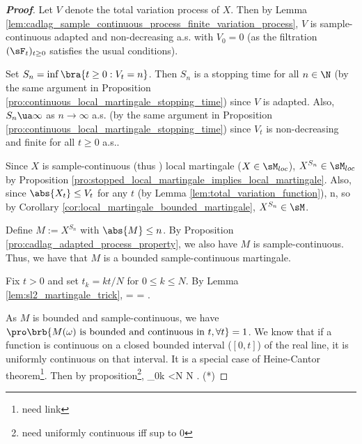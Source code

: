 \begin{proof}[\bf Proof]
Let $V$ denote the total variation process of $X$. Then by Lemma \ref{lem:cadlag_sample_continuous_process_finite_variation_process}, $V$ is sample-continuous adapted and non-decreasing a.s. with $V_0 = 0$ (as the filtration $(\sF_t)_{t\geq 0}$ satisfies the usual conditions).

Set $S_n = \inf\bra{t \geq 0 : V_t = n}$. Then $S_n$ is a stopping time for all $n \in \N$ (by the same argument in Proposition \ref{pro:continuous_local_martingale_stopping_time}) since $V$ is adapted. Also, $S_n \ua \infty$ as $n \to \infty$ a.s. (by the same argument in Proposition \ref{pro:continuous_local_martingale_stopping_time}) since $V_t$ is non-decreasing and finite for all $t \geq 0$ a.s..

Since $X$ is sample-continuous (thus \cadlag) local martingale ($X\in \sM_{loc}$), $X^{S_n} \in \sM_{loc}$ by Proposition \ref{pro:stopped_local_martingale_implies_local_martingale}. Also, since $\abs{X_t} \leq V_t$ for any $t$ (by Lemma \ref{lem:total_variation_function}),
\be
{} \leq {} \leq n,
\ee
so by Corollary \ref{cor:local_martingale_bounded_martingale}, $X^{S_n} \in \sM$.

Define $M := X^{S_n}$ with $\abs{M}\leq n$. By Proposition \ref{pro:cadlag_adapted_process_property}, we also have $M$ is sample-continuous. Thus, we have that $M$ is a bounded sample-continuous martingale.


Fix $t > 0$ and set $t_k = kt/N$ for $0 \leq k \leq N$. By Lemma \ref{lem:sl2_martingale_trick},
\be
\E{} = \E{} = \E{} \leq  \E{}.\nonumber
\ee

As $M$ is bounded and sample-continuous, we have $\pro\brb{M(\omega) \text{ is bounded and continuous in }t, \forall t} = 1$. We know that if a function is continuous on a closed bounded interval ($[0,t]$) of the real line, it is uniformly continuous on that interval. It is a special case of Heine-Cantor theorem\footnote{need link}. Then by proposition\footnote{need uniformly continuous iff sup to 0},
\be
\sup_{0\leq k <N}   \quad {}N \to \infty. \quad\quad (*)
\ee



\end{proof}
